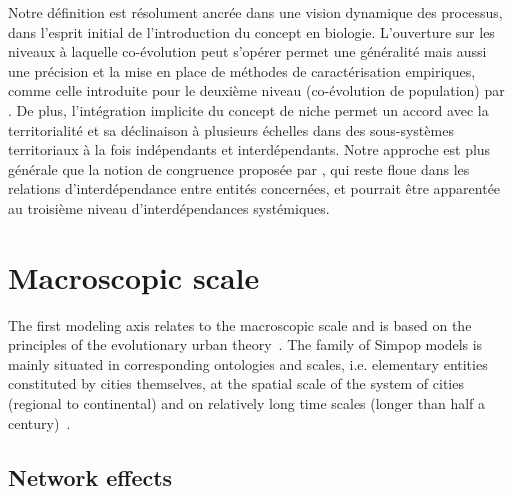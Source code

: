\documentclass[11pt]{article}
\begin{document}
Notre définition est résolument ancrée dans une vision dynamique des processus, dans l'esprit initial de l'introduction du concept en biologie. L'ouverture sur les niveaux à laquelle co-évolution peut s'opérer permet une généralité mais aussi une précision et la mise en place de méthodes de caractérisation empiriques, comme celle introduite pour le deuxième niveau (co-évolution de population) par \cite{raimbault2017identification}. De plus, l'intégration implicite du concept de niche permet un accord avec la territorialité et sa déclinaison à plusieurs échelles dans des sous-systèmes territoriaux à la fois indépendants et interdépendants. Notre approche est plus générale que la notion de congruence proposée par \cite{offner1993effets}, qui reste floue dans les relations d'interdépendance entre entités concernées, et pourrait être apparentée au troisième niveau d'interdépendances systémiques.








\section{Macroscopic scale}


The first modeling axis relates to the macroscopic scale and is based on the principles of the evolutionary urban theory~\citep{pumain1997pour}. The family of Simpop models is mainly situated in corresponding ontologies and scales, i.e. elementary entities constituted by cities themselves, at the spatial scale of the system of cities (regional to continental) and on relatively long time scales (longer than half a century)~\citep{pumain2012multi}.


\subsection{Network effects}
\end{document}
